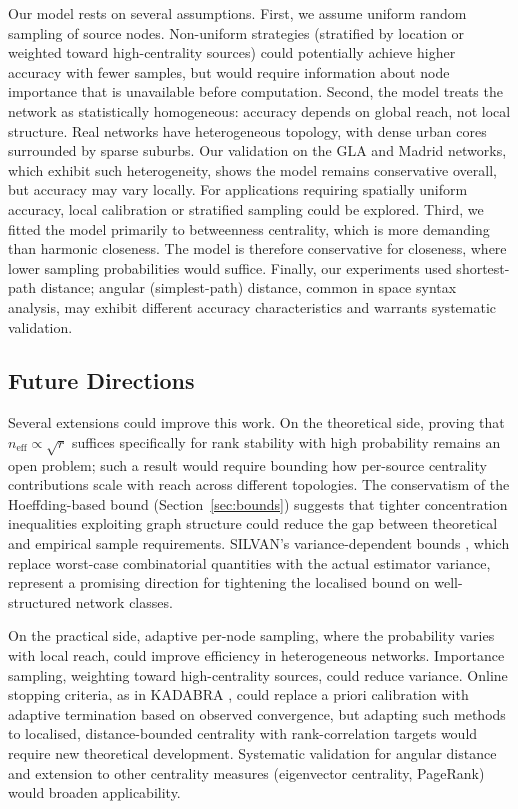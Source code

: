 Our model rests on several assumptions. First, we assume uniform random sampling of source nodes. Non-uniform strategies (stratified by location or weighted toward high-centrality sources) could potentially achieve higher accuracy with fewer samples, but would require information about node importance that is unavailable before computation. Second, the model treats the network as statistically homogeneous: accuracy depends on global reach, not local structure. Real networks have heterogeneous topology, with dense urban cores surrounded by sparse suburbs. Our validation on the GLA and Madrid networks, which exhibit such heterogeneity, shows the model remains conservative overall, but accuracy may vary locally. For applications requiring spatially uniform accuracy, local calibration or stratified sampling could be explored. Third, we fitted the model primarily to betweenness centrality, which is more demanding than harmonic closeness. The model is therefore conservative for closeness, where lower sampling probabilities would suffice. Finally, our experiments used shortest-path distance; angular (simplest-path) distance, common in space syntax analysis, may exhibit different accuracy characteristics and warrants systematic validation.

\subsection{Future Directions}
\label{sec:future}

Several extensions could improve this work. On the theoretical side, proving that $n_{\text{eff}} \propto \sqrt{r}$ suffices specifically for rank stability with high probability remains an open problem; such a result would require bounding how per-source centrality contributions scale with reach across different topologies. The conservatism of the Hoeffding-based bound (Section~\ref{sec:bounds}) suggests that tighter concentration inequalities exploiting graph structure could reduce the gap between theoretical and empirical sample requirements. SILVAN's variance-dependent bounds \citep{Pellegrina2023}, which replace worst-case combinatorial quantities with the actual estimator variance, represent a promising direction for tightening the localised bound on well-structured network classes.

On the practical side, adaptive per-node sampling, where the probability varies with local reach, could improve efficiency in heterogeneous networks. Importance sampling, weighting toward high-centrality sources, could reduce variance. Online stopping criteria, as in KADABRA \citep{Borassi2019}, could replace a priori calibration with adaptive termination based on observed convergence, but adapting such methods to localised, distance-bounded centrality with rank-correlation targets would require new theoretical development. Systematic validation for angular distance and extension to other centrality measures (eigenvector centrality, PageRank) would broaden applicability.
